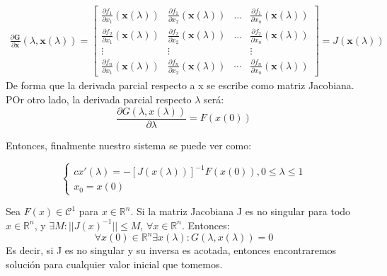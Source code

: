 \[\begin{aligned}
	\frac{\partial \mathbf{G}}{\partial \mathbf{x}}(\lambda, \mathbf{x}(\lambda)) = \left[\begin{array}{cccc}
		\frac{\partial f_{1}}{\partial x_{1}}(\mathbf{x}(\lambda)) & \frac{\partial f_{1}}{\partial x_{2}}(\mathbf{x}(\lambda)) & \ldots & \frac{\partial f_{1}}{\partial x_{n}}(\mathbf{x}(\lambda)) \\
		\frac{\partial f_{2}}{\partial x_{1}}(\mathbf{x}(\lambda)) & \frac{\partial f_{2}}{\partial x_{2}}(\mathbf{x}(\lambda)) & \ldots & \frac{\partial f_{2}}{\partial x_{n}}(\mathbf{x}(\lambda)) \\
		\vdots & \vdots & & \vdots \\
		\frac{\partial f_{n}}{\partial x_{1}}(\mathbf{x}(\lambda)) & \frac{\partial f_{n}}{\partial x_{2}}(\mathbf{x}(\lambda)) & \cdots & \frac{\partial f_{n}}{\partial x_{n}}(\mathbf{x}(\lambda))
	\end{array}\right]=J(\mathbf{x}(\lambda))
\end{aligned}\]
De forma que la derivada parcial respecto a x se escribe como matriz Jacobiana. POr otro lado, la derivada parcial respecto $\lambda$ será:
\[\frac{\partial G(\lambda,x(\lambda))}{\partial \lambda} = F(x(0))\]

Entonces, finalmente nuestro sistema se puede ver como:

\[\begin{cases}{c}
	x'(\lambda) = -[J(x(\lambda))]^{-1}F(x(0)), 0 \leq \lambda \leq 1 \\
	x_0 = x(0)
\end{cases}\]

\begin{theorem}
	Sea $F(x) \in \mathcal{C}^{1}$ para $x \in \mathbb{R}^n$. Si la matriz Jacobiana J es no singular para todo $x \in \mathbb{R}^n$, y $\exists M : ||J(x)^{-1}|| \leq M$, $\forall x \in \mathbb{R}^n$. Entonces: 
	\[\forall x(0) \in \mathbb{R}^n \exists x(\lambda) : G(\lambda,x(\lambda)) = 0\]
	Es decir, si J es no singular y su inversa es acotada, entonces encontraremos solución para cualquier valor inicial que tomemos.
\end{theorem}

